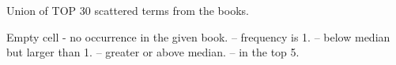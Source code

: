 \begin{table}[ht]
\begin{center}
\scalebox{0.8}{
  
}
\caption{Union of TOP 30 scattered terms from the books.}
 Empty cell - no occurrence in the given book. \oneDot{} -- frequency is 1. \belowMdot{} -- below median but larger than 1. \greaterMdot{} -- greater or above median. \topNdot{} -- in the top 5.
\label{F:unionTopScatternessVisual}
\end{center}
\end{table}